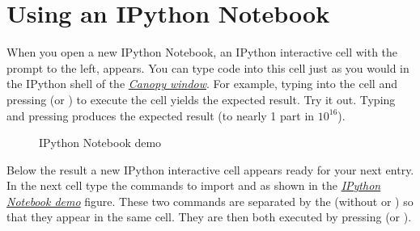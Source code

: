 \documentclass[letterpaper,10pt,english]{sphinxmanual}
\begin{document}
\section{Using an IPython Notebook}
\label{apdx2/apdx2_ipynb:using-an-ipython-notebook}
When you open a new IPython Notebook, an IPython interactive cell with the prompt  to the left, appears.  You can type code into this cell just as you would in the IPython shell of the {\hyperref[chap2/chap2_basics:fig-canopywindow]{\emph{Canopy window}}}.  For example, typing  into the cell and pressing  (or ) to execute the cell yields the expected result.  Try it out.  Typing  and pressing  produces the expected result (to nearly 1 part in \(10^{16}\)).
\begin{figure}[htbp]
\centering
\capstart

\caption{IPython Notebook demo}\label{apdx2/apdx2_ipynb:fig-firstipynbcells}\end{figure}

Below the result a new IPython interactive cell appears ready for your next entry.  In the next cell type the commands to import  and  as shown in the {\hyperref[apdx2/apdx2_ipynb:fig-firstipynbcells]{\emph{IPython Notebook demo}}} figure.  These two commands are separated by the  (without  or ) so that they appear in the same cell.  They are then both executed by pressing  (or ).
\end{document}
